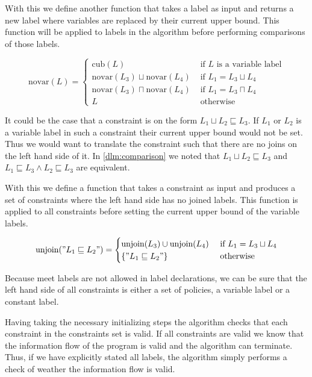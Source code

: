 With this we define another function that takes a label as input and returns a new label where variables are replaced by their current upper bound.
This function will be applied to labels in the algorithm before performing comparisons of those labels.

\[
\text{novar}(L) =
\begin{cases}
  \text{cub}(L) & \text{ if } L \text{ is a variable label}\\
  \text{novar}(L_3) \sqcup \text{novar}(L_4) & \text{ if } L_1 = L_3 \sqcup L_4\\
  \text{novar}(L_3) \sqcap \text{novar}(L_4) & \text{ if } L_1 = L_3 \sqcap L_4\\
  L & \text{ otherwise}
\end{cases}
\]

It could be the case that a constraint is on the form $L_1 \sqcup L_2 \sqsubseteq L_3$.
If $L_1$ or $L_2$ is a variable label in such a constraint their current upper bound would not be set.
Thus we would want to translate the constraint such that there are no joins on the left hand side of it.
In \cref{dlm:comparison} we noted that $L_1 \sqcup L_2 \sqsubseteq L_3$ and $L_1 \sqsubseteq L_3 \wedge L_2 \sqsubseteq L_3$ are equivalent.

With this we define a function that takes a constraint as input and produces a set of constraints where the left hand side has no joined labels.
This function is applied to all constraints before setting the current upper bound of the variable labels.

\[
\text{unjoin}("L_1 \sqsubseteq L_2") =
\begin{cases}
  \text{unjoin}(L_3) \cup \text{unjoin}(L_4) & \text{ if } L_1 = L_3 \sqcup L_4\\
  \{"L_1 \sqsubseteq L_2"\} & \text{ otherwise}
\end{cases}
\]

Because meet labels are not allowed in label declarations, we can be sure that the left hand side of all constraints is either a set of policies, a variable label or a constant label.

Having taking the necessary initializing steps the algorithm checks that each constraint in the constraints set is valid.
If all constraints are valid we know that the information flow of the program is valid and the algorithm can terminate.
Thus, if we have explicitly stated all labels, the algorithm simply performs a check of weather the information flow is valid.

